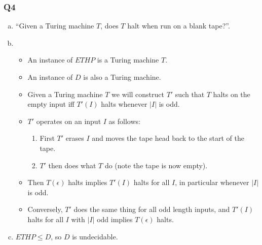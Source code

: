 \documentclass[handout]{beamer}
\begin{document}
\begin{frame}
\frametitle{Q4}
\begin{enumerate}[a)]
\item ``Given a Turing machine $T$, does $T$ halt when run on a blank tape?''.
\item \begin{itemize}
\item An instance of $ETHP$ is a Turing machine $T$. 
\item An instance of $D$ is also a Turing machine. 
\item Given a Turing machine $T$ we will construct $T'$ such that $T$ halts on the empty input iff $T'(I)$ halts whenever $|I|$ is odd. 
\item $T'$ operates on an input $I$ as follows:
\begin{enumerate}[1)]
\item First $T'$ erases $I$ and moves the tape head back to the start of the tape.
\item $T'$ then does what $T$ do (note the tape is now empty).
\end{enumerate}
\item Then $T(\epsilon)$ halts implies $T'(I)$ halts for all $I$, in particular whenever $|I|$ is odd. 
\item Conversely, $T'$ does the same thing for all odd length inputs, and $T'(I)$ halts for all $I$ with $|I|$ odd implies $T(\epsilon)$ halts.
\end{itemize}
\item $ETHP\leq D$, so $D$ is undecidable.
\end{enumerate}
\end{frame}
\end{document}
